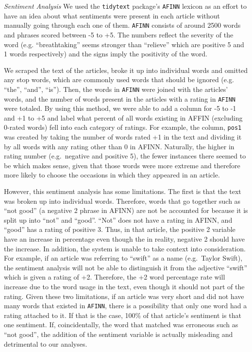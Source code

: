 \documentclass[10pt,letterpaper]{article}
\begin{document}
\emph{Sentiment Analysis} We used the \texttt{tidytext} package's
\texttt{AFINN} lexicon as an effort to have an idea about what
sentiments were present in each article without manually going through
each one of them. \texttt{AFINN} consists of around 2500 words and
phrases scored between -5 to +5. The numbers reflect the severity of the
word (e.g. ``breathtaking'' seems stronger than ``relieve'' which are
positive 5 and 1 words respectively) and the signs imply the positivity
of the word.

We scraped the text of the articles, broke it up into individual words
and omitted any stop words, which are commonly used words that should be
ignored (e.g. ``the'', ``and'', ``is''). Then, the words in
\texttt{AFINN} were joined with the articles' words, and the number of
words present in the articles with a rating in \texttt{AFINN} were
totaled. By using this method, we were able to add a column for -5 to -1
and +1 to +5 and label what percent of all words existing in AFFIN
(excluding 0-rated words) fell into each category of ratings. For
example, the column, \texttt{pos1} was created by taking the number of
words rated +1 in the text and dividing it by all words with any rating
other than 0 in AFINN. Naturally, the higher in rating number
(e.g.~negative and positive 5), the fewer instances there seemed to be
which makes sense, given that those words were more extreme and
therefore more likely to choose the occasions in which they appeared in
an article.

However, this sentiment analysis has some limitations. The first is that
the text was broken up into individual words. Therefore, words that go
together such as ``not good'' (a negative 2 phrase in AFINN) are not be
accounted for because it is split up into ``not'' and ``good''. ``Not''
does not have a rating in AFINN, and ``good'' has a rating of positive
3. Thus, in that article, the positive 2 variable have an increase in
percentage even though the in reality, negative 2 should have the
increase. In addition, the system is unable to take context into
consideration. For example, if an article was referring to ``swift'' as
a name (e.g.~Taylor Swift), the sentiment analysis will not be able to
distinguish it from the adjective ``swift'' which is given a rating of
+2. Therefore, the +2 word percentage rate will increase due to the word
usage in the text, even though it should not part of the rating. Given
these two limitations, if an article was very short and did not have
many words that existed in \texttt{AFINN}, there is a possibility that
only one word had a rating attached to it. If that is the case, 100\% of
that article's sentiment is that one sentiment. If, coincidentally, the
word that matched was erroneous such as ``not good'', the addition of
the sentiment variable is actually misleading and detrimental to our
analyses.
\end{document}
